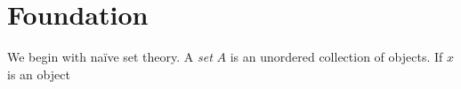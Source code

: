 
\chapter{Foundation}

We begin with na\"ive set theory. A \emph{set} $A$ is an unordered collection of objects. If $x$ is an object


